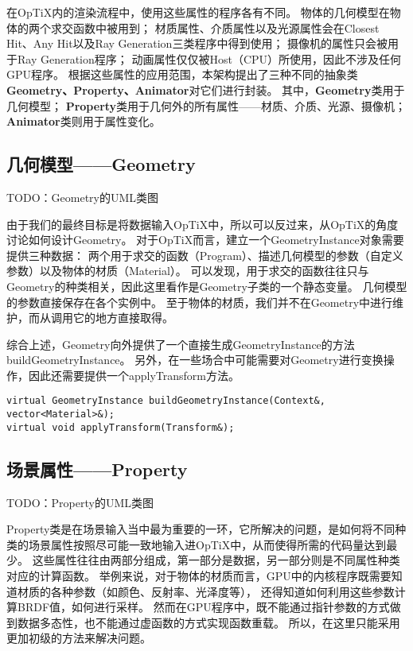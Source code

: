 在OpTiX内的渲染流程中，使用这些属性的程序各有不同。
物体的几何模型在物体的两个求交函数中被用到；
材质属性、介质属性以及光源属性会在Closest Hit、Any Hit以及Ray Generation三类程序中得到使用；
摄像机的属性只会被用于Ray Generation程序；
动画属性仅仅被Host（CPU）所使用，因此不涉及任何GPU程序。
根据这些属性的应用范围，本架构提出了三种不同的抽象类\textbf{Geometry、Property、Animator}对它们进行封装。
其中，\textbf{Geometry}类用于几何模型；
\textbf{Property}类用于几何外的所有属性——材质、介质、光源、摄像机；
\textbf{Animator}类则用于属性变化。

\subsection{几何模型——Geometry}
TODO：Geometry的UML类图

由于我们的最终目标是将数据输入OpTiX中，所以可以反过来，从OpTiX的角度讨论如何设计Geometry。
对于OpTiX而言，建立一个GeometryInstance对象需要提供三种数据：
两个用于求交的函数（Program）、描述几何模型的参数（自定义参数）以及物体的材质（Material）。
可以发现，用于求交的函数往往只与Geometry的种类相关，因此这里看作是Geometry子类的一个静态变量。
几何模型的参数直接保存在各个实例中。
至于物体的材质，我们并不在Geometry中进行维护，而从调用它的地方直接取得。

综合上述，Geometry向外提供了一个直接生成GeometryInstance的方法buildGeometryInstance。
另外，在一些场合中可能需要对Geometry进行变换操作，因此还需要提供一个applyTransform方法。

\lstset{language=C++}
\begin{lstlisting}
virtual GeometryInstance buildGeometryInstance(Context&, vector<Material>&);
virtual void applyTransform(Transform&);
\end{lstlisting}

\subsection{场景属性——Property}
TODO：Property的UML类图

Property类是在场景输入当中最为重要的一环，它所解决的问题，是如何将不同种类的场景属性按照尽可能一致地输入进OpTiX中，从而使得所需的代码量达到最少。
这些属性往往由两部分组成，第一部分是数据，另一部分则是不同属性种类对应的计算函数。
举例来说，对于物体的材质而言，GPU中的内核程序既需要知道材质的各种参数（如颜色、反射率、光泽度等），
还得知道如何利用这些参数计算BRDF值，如何进行采样。
然而在GPU程序中，既不能通过指针参数的方式做到数据多态性，也不能通过虚函数的方式实现函数重载。
所以，在这里只能采用更加初级的方法来解决问题。

